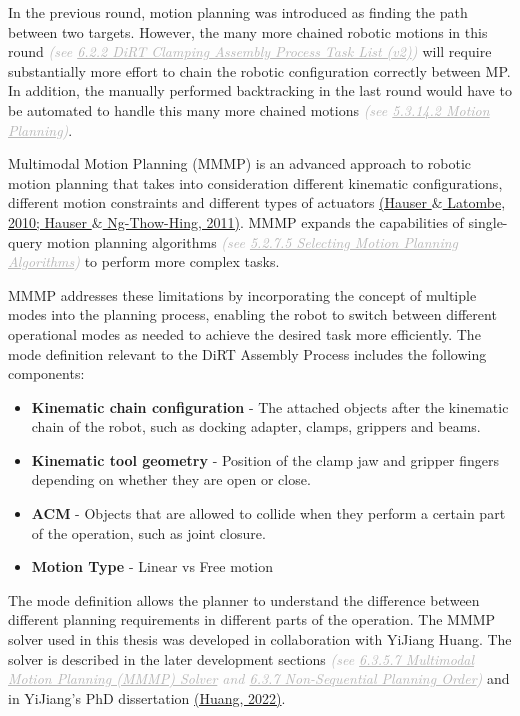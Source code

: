 In the previous round, motion planning was introduced as finding the path between two targets. However, the many more chained robotic motions in this round \textit{\textcolor[HTML]{B7B7B7}{(see \uline{6.2.2 DiRT Clamping Assembly Process Task List (v2)}) }}will require substantially more effort to chain the robotic configuration correctly between MP. In addition, the manually performed backtracking in the last round would have to be automated to handle this many more chained motions \textit{\textcolor[HTML]{B7B7B7}{(see \uline{5.3.14.2 Motion Planning})}}. 

Multimodal Motion Planning (MMMP) is an advanced approach to robotic motion planning that takes into consideration different kinematic configurations, different motion constraints and different types of actuators \href{https://www.zotero.org/google-docs/?a7FuIN}{(Hauser $\&$ Latombe, 2010; Hauser $\&$ Ng-Thow-Hing, 2011)}. MMMP expands the capabilities of single-query motion planning algorithms \textit{\textcolor[HTML]{B7B7B7}{(see \uline{5.2.7.5 Selecting Motion Planning Algorithms})}} to perform more complex tasks.

MMMP addresses these limitations by incorporating the concept of multiple modes into the planning process, enabling the robot to switch between different operational modes as needed to achieve the desired task more efficiently. The mode definition relevant to the DiRT Assembly Process includes the following components:

\begin{itemize}
	\item \textbf{Kinematic chain configuration }- The attached objects after the kinematic chain of the robot, such as docking adapter, clamps, grippers and beams.

	\item \textbf{Kinematic tool geometry} - Position of the clamp jaw and gripper fingers depending on whether they are open or close.

	\item \textbf{ACM }- Objects that are allowed to collide when they perform a certain part of the operation, such as joint closure.

	\item \textbf{Motion Type} - Linear vs Free motion

\end{itemize}
The mode definition allows the planner to understand the difference between different planning requirements in different parts of the operation. The MMMP solver used in this thesis was developed in collaboration with YiJiang Huang. The solver is described in the later development sections \textit{\textcolor[HTML]{B7B7B7}{(see \uline{6.3.5.7 Multimodal Motion Planning (MMMP) Solver} and \uline{6.3.7 Non-Sequential Planning Order})}} and in YiJiang’s PhD dissertation \href{https://www.zotero.org/google-docs/?R37lZz}{(Huang, 2022)}.

